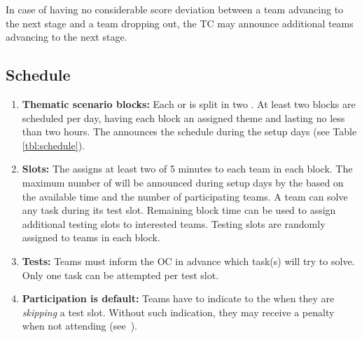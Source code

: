 In case of having no considerable score deviation between a team advancing to the next stage and a team dropping out, the TC may announce additional teams advancing to the next stage.


\subsection{Schedule}
\label{rule:schedule}

\begin{enumerate}
	\item \textbf{Thematic scenario blocks:} Each  or  is split in two .
	At least two blocks are scheduled per day, having each block an assigned theme and lasting no less than two hours.
	The  announces the schedule during the setup days (see Table \ref{tbl:schedule}).

	\item \textbf{Slots:} The  assigns at least two  of 5 minutes to each team in each block.
   The maximum number of  will be announced during setup days by the  based on the available time and the number of participating teams.
	A team can solve any task during its test slot.
	Remaining block time can be used to assign additional testing slots to interested teams.
	Testing slots are randomly assigned to teams in each block.

	\item \textbf{Tests:} Teams must inform the OC in advance which task(s) will try to solve.
	Only one task can be attempted per test slot.

	\item \textbf{Participation is default:} Teams have to indicate to the  when they are \emph{skipping} a test slot. Without such indication, they may receive a penalty when not attending (see~).
\end{enumerate}

